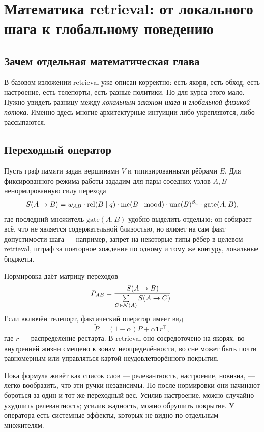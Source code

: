 \chapter{Математика retrieval: от локального шага к глобальному поведению}
\label{ch:retrievalmath}

\section{Зачем отдельная математическая глава}

В базовом изложении retrieval уже описан корректно: есть якоря, есть обход,
есть настроение, есть телепорты, есть разные политики. Но для курса этого мало.
Нужно увидеть разницу между \emph{локальным законом шага} и \emph{глобальной
физикой потока}. Именно здесь многие архитектурные интуиции либо укрепляются,
либо рассыпаются.

\section{Переходный оператор}

Пусть граф памяти задан вершинами $V$ и типизированными рёбрами $E$. Для фиксированного
режима работы зададим для пары соседних узлов $A,B$ ненормированную силу перехода
\[
S(A\to B)
=
w_{AB}\cdot
\mathrm{rel}(B\mid q)\cdot
\mathrm{mc}(B\mid \mathrm{mood})\cdot
\mathrm{unc}(B)^{\beta_u}\cdot
\mathrm{gate}(A,B),
\]
где последний множитель $\mathrm{gate}(A,B)$ удобно выделить отдельно: он собирает
всё, что не является содержательной близостью, но влияет на сам факт допустимости
шага — например, запрет на некоторые типы рёбер в целевом retrieval, штраф за
повторное хождение по одному и тому же контуру, локальные бюджеты.

Нормировка даёт матрицу переходов
\[
P_{AB}=\frac{S(A\to B)}{\sum\limits_{C\in \mathcal{N}(A)} S(A\to C)}.
\]
Если включён телепорт, фактический оператор имеет вид
\[
\widetilde P=(1-\alpha)P+\alpha \mathbf{1}r^\top,
\]
где $r$ — распределение рестарта. В retrieval оно сосредоточено на якорях, во
внутренней жизни смещено к зонам неопределённости, во сне может быть почти
равномерным или управляться картой неудовлетворённого покрытия.

\begin{intuition}
Пока формула живёт как список слов — релевантность, настроение, новизна, — легко
вообразить, что эти ручки независимы. Но после нормировки они начинают бороться
за один и тот же переходный вес. Усилив настроение, можно случайно ухудшить
релевантность; усилив жадность, можно обрушить покрытие. У оператора есть
системные эффекты, которых не видно по отдельным множителям.
\end{intuition}

